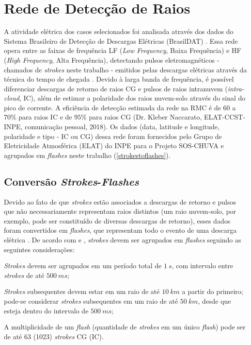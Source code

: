 \section{Rede de Detecção de Raios}\label{raios}

A atividade elétrica dos casos selecionados foi analisada através dos dados do Sistema Brasileiro de Detecção de Descargas Elétricas (BrasilDAT) \cite{Naccarato2014}. Essa rede opera entre as faixas de frequência LF (\textit{Low Frequency}, Baixa Frequência) e HF (\textit{High Frequency}, Alta Frequência), detectando pulsos eletromagnéticos - chamados de \textit{strokes} neste trabalho - emitidos pelas descargas elétricas através da técnica do tempo de chegada \cite{Lewis1960}. Devido à larga banda de frequência, é possível diferenciar descargas de retorno de raios CG e pulsos de raios intranuvem (\textit{intra-cloud}, IC), além de estimar a polaridade dos raios nuvem-solo através do sinal do pico de corrente. A eficiência de detecção estimada da rede na RMC é de $60$ a $70\%$ para raios IC e de $95\%$ para raios CG (Dr. Kleber Naccarato, ELAT-CCST-INPE, comunicação pessoal, 2018). Os dados (data, latitude e longitude, polaridade e tipo - IC ou CG) dessa rede foram fornecidos pelo Grupo de Eletricidade Atmosférica (ELAT) do INPE para o Projeto SOS-CHUVA e agrupados em \textit{flashes} neste trabalho (\autoref{strokestoflashes}).

\subsection{Conversão \textit{Strokes}-\textit{Flashes}}\label{strokestoflashes}

Devido ao fato de que \textit{strokes} estão associados a descargas de retorno e pulsos que não necessariamente representam raios distintos (um raio nuvem-solo, por exemplo, pode ser constituído de diversas descargas de retorno), esses dados foram convertidos em \textit{flashes}, que representam todo o evento de uma descarga elétrica \cite{MacGorman1998b}. De acordo com  e , \textit{strokes} devem ser agrupados em \textit{flashes} seguindo as seguintes considerações:

\begin{alineas}
	\item \textit{Strokes} devem ser agrupados em um período total de $1\:s$, com intervalo entre \textit{strokes} de até $500\:ms$;
	\item \textit{Strokes} subsequentes devem estar em um raio de até $10\:km$ a partir do primeiro; pode-se considerar \textit{strokes} subsequentes em um raio de até $50\:km$, desde que esteja dentro do intervalo de $500\:ms$;
	\item A multiplicidade de um \textit{flash} (quantidade de \textit{strokes} em um único \textit{flash}) pode ser de até 63 (1023) \textit{strokes} CG (IC).
\end{alineas} 

